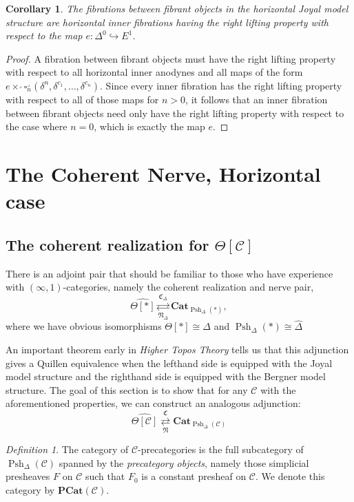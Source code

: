 \documentclass[leqno]{article}
\numberwithin{equation}{subsection}
\theoremstyle{plain}   %
\newtheorem{cor}[equation]{Corollary}
\theoremstyle{remark}
\newtheorem{defn}[equation]{Definition}
\theoremstyle{plain}
\DeclareMathOperator{\Psh}{Psh}
\newcommand{\Cat}{\ensuremath{\mathbf{Cat}}}
\newcommand{\psh}[1]{\ensuremath{\widehat{#1}}}
\renewcommand{\C}{\ensuremath{\mathcal{C}}}
\newcommand{\cellset}{\ensuremath{\widehat{\Theta[\mathcal{C}]}}}
\newcommand{\spsh}{\ensuremath{\operatorname{Psh}_\Delta(\mathcal{C})}}
\begin{document}
\begin{cor}
	The fibrations between fibrant objects in the horizontal Joyal model structure are horizontal inner fibrations having the right lifting property with respect to the map \(e:\Delta^0\hookrightarrow E^1\).
\end{cor}
\begin{proof} 
	A fibration between fibrant objects must have the right lifting property with respect to all horizontal inner anodynes and all maps of the form \(e\times^\lrcorner  \square_n^\lrcorner(\delta^n,\delta^{c_1},\dots,\delta^{c_n})\).  Since every inner fibration has the right lifting property with respect to all of those maps for \(n>0\), it follows that an inner fibration between fibrant objects need only have the right lifting property with respect to the case where \(n=0\), which is exactly the map \(e\).
\end{proof}


\section{The Coherent Nerve, Horizontal case}
\subsection{The coherent realization for \(\Theta[\C]\)}
There is an adjoint pair that should be familiar to those who have experience with \((\infty,1)\)-categories, namely the coherent realization and nerve pair, \[\psh{\Theta[\ast]}  \underset{\mathfrak{N}_\Delta}{\overset{\mathfrak{C}_\Delta}{\rightleftarrows}} \Cat_{\Psh_\Delta(\ast)},\] where we have obvious isomorphisms \(\Theta[\ast]\cong \Delta\) and \(\Psh_\Delta(\ast)\cong \psh{\Delta}\)

An important theorem early in \emph{Higher Topos Theory} tells us that this adjunction gives a Quillen equivalence when the lefthand side is equipped with the Joyal model structure and the righthand side is equipped with the Bergner model structure.  The goal of this section is to show that for any \(\C\) with the aforementioned properties, we can construct an analogous adjunction:
\[\cellset \underset{\mathfrak{N}}{\overset{\mathfrak{C}}{\rightleftarrows}} \Cat_{\spsh}\]


\begin{defn} 
	The category of \(\C\)-precategories is the full subcategory of \(\spsh\) spanned by the \emph{precategory objects}, namely those simplicial presheaves \(F\) on \(\C\) such that \(F_0\) is a constant presheaf on \(\C\).  We denote this category by \(\mathbf{PCat}(\C)\). 
\end{defn}
\end{document}
